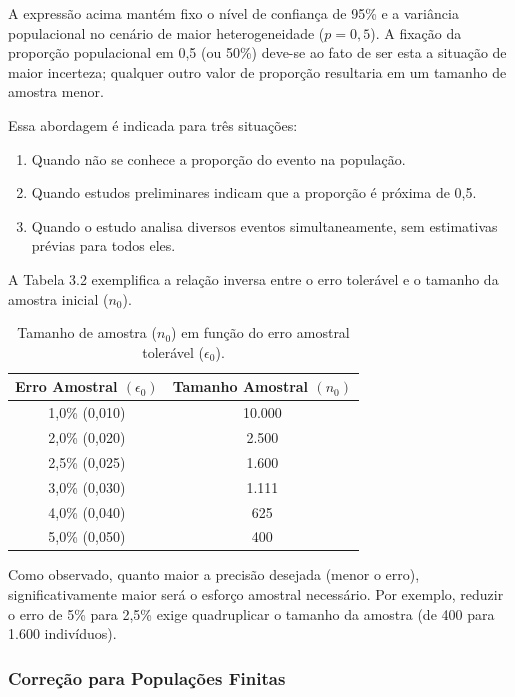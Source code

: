 A expressão acima mantém fixo o nível de confiança de 95\% e a variância populacional no cenário de maior heterogeneidade ($p = 0,5$). A fixação da proporção populacional em 0,5 (ou 50\%) deve-se ao fato de ser esta a situação de maior incerteza; qualquer outro valor de proporção resultaria em um tamanho de amostra menor. \vskip0.3cm

Essa abordagem é indicada para três situações:
\begin{enumerate}
    \item Quando não se conhece a proporção do evento na população.
    \item Quando estudos preliminares indicam que a proporção é próxima de 0,5.
    \item Quando o estudo analisa diversos eventos simultaneamente, sem estimativas prévias para todos eles.
\end{enumerate}


A Tabela 3.2 exemplifica a relação inversa entre o erro tolerável e o tamanho da amostra inicial ($n_0$).

\begin{table}[!htb]
    \centering
    \caption{Tamanho de amostra ($n_{0}$) em função do erro amostral tolerável ($\epsilon_0$).}
    \label{tab:amostras}
    \vspace{0.2cm}
    \begin{tabular}{c|c}
    \hline\hline
    \textbf{Erro Amostral} $(\epsilon_{0})$ & \textbf{Tamanho Amostral} $(n_{0})$ \\
    \hline\hline
    1,0\% (0,010)    &  10.000 \\
    2,0\% (0,020)    &  2.500  \\
    2,5\% (0,025)    &  1.600  \\
    3,0\% (0,030)    &  1.111  \\
    4,0\% (0,040)    &  625    \\
    5,0\% (0,050)    &  400    \\
    \hline\hline
    \end{tabular}
\end{table}

Como observado, quanto maior a precisão desejada (menor o erro), significativamente maior será o esforço amostral necessário. Por exemplo, reduzir o erro de 5\% para 2,5\% exige quadruplicar o tamanho da amostra (de 400 para 1.600 indivíduos).
\vskip0.3cm

\subsubsection{Correção para Populações Finitas}

